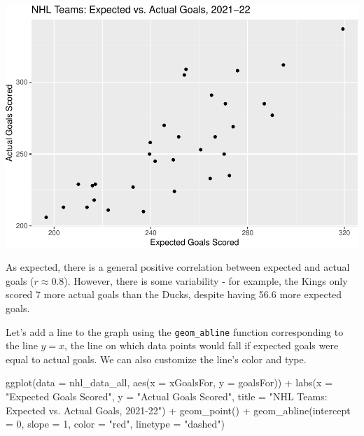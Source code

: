 \documentclass[
  11pt,
]{book}
\newenvironment{Shaded}{\begin{snugshade}}{\end{snugshade}}
\newcommand{\AttributeTok}[1]{\textcolor[rgb]{0.77,0.63,0.00}{#1}}
\newcommand{\DecValTok}[1]{\textcolor[rgb]{0.00,0.00,0.81}{#1}}
\newcommand{\FunctionTok}[1]{\textcolor[rgb]{0.00,0.00,0.00}{#1}}
\newcommand{\NormalTok}[1]{#1}
\newcommand{\SpecialCharTok}[1]{\textcolor[rgb]{0.00,0.00,0.00}{#1}}
\newcommand{\StringTok}[1]{\textcolor[rgb]{0.31,0.60,0.02}{#1}}
\theoremstyle{definition}
\theoremstyle{definition}
\theoremstyle{definition}
\theoremstyle{definition}
\theoremstyle{remark}
\begin{document}
\includegraphics{series_files/figure-latex/hockey_ggplot3-1.pdf}

As expected, there is a general positive correlation between expected and actual goals (\(r \approx 0.8\)). However, there is some variability - for example, the Kings only scored 7 more actual goals than the Ducks, despite having 56.6 more expected goals.

Let's add a line to the graph using the \texttt{geom\_abline} function corresponding to the line \(y=x\), the line on which data points would fall if expected goals were equal to actual goals. We can also customize the line's color and type.

\begin{Shaded}
\begin{Highlighting}[]
\FunctionTok{ggplot}\NormalTok{(}\AttributeTok{data =}\NormalTok{ nhl\_data\_all, }\FunctionTok{aes}\NormalTok{(}\AttributeTok{x =}\NormalTok{ xGoalsFor, }\AttributeTok{y =}\NormalTok{ goalsFor)) }\SpecialCharTok{+} \FunctionTok{labs}\NormalTok{(}\AttributeTok{x =} \StringTok{"Expected Goals Scored"}\NormalTok{,}
    \AttributeTok{y =} \StringTok{"Actual Goals Scored"}\NormalTok{, }\AttributeTok{title =} \StringTok{"NHL Teams: Expected vs. Actual Goals, 2021{-}22"}\NormalTok{) }\SpecialCharTok{+}
    \FunctionTok{geom\_point}\NormalTok{() }\SpecialCharTok{+} \FunctionTok{geom\_abline}\NormalTok{(}\AttributeTok{intercept =} \DecValTok{0}\NormalTok{, }\AttributeTok{slope =} \DecValTok{1}\NormalTok{, }\AttributeTok{color =} \StringTok{"red"}\NormalTok{, }\AttributeTok{linetype =} \StringTok{"dashed"}\NormalTok{)}
\end{Highlighting}
\end{Shaded}
\end{document}
